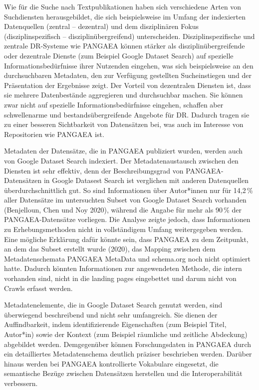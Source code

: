 \documentclass[a4paper,
fontsize=11pt,
oneside,
numbers=noperiodatend,
parskip=half-,
bibliography=totoc,
final
]{scrartcl}
\begin{document}
Wie für die Suche nach Textpublikationen haben sich verschiedene Arten
von Suchdiensten herausgebildet, die sich beispielsweise im Umfang der
indexierten Datenquellen (zentral -- dezentral) und dem disziplinären
Fokus (disziplinspezifisch -- disziplinübergreifend) unterscheiden.
Disziplinspezifische und zentrale DR-Systeme wie PANGAEA können stärker
als disziplinübergreifende oder dezentrale Dienste (zum Beispiel Google
Dataset Search) auf spezielle Informationsbedürfnisse ihrer Nutzenden
eingehen, was sich beispielsweise an den durchsuchbaren Metadaten, den
zur Verfügung gestellten Sucheinstiegen und der Präsentation der
Ergebnisse zeigt. Der Vorteil von dezentralen Diensten ist, dass sie
mehrere Datenbestände aggregieren und durchsuchbar machen. Sie können
zwar nicht auf spezielle Informationsbedürfnisse eingehen, schaffen aber
schwellenarme und bestandsübergreifende Angebote für DR. Dadurch tragen
sie zu einer besseren Sichtbarkeit von Datensätzen bei, was auch im
Interesse von Repositorien wie PANGAEA ist.

Metadaten der Datensätze, die in PANGAEA publiziert wurden, werden auch
von Google Dataset Search indexiert. Der Metadatenaustausch zwischen den
Diensten ist sehr effektiv, denn der Beschreibungsgrad von
PANGAEA-Datensätzen in Google Datasest Search ist verglichen mit anderen
Datenquellen überdurchschnittlich gut. So sind Informationen über
Autor*innen nur für 14,2\,\% aller Datensätze im untersuchten Subset von
Google Dataset Search vorhanden (Benjelloun, Chen und Noy 2020), während
die Angabe für mehr als 90\,\% der PANGAEA-Datensätze vorliegen. Die
Analyse zeigte jedoch, dass Informationen zu Erhebungsmethoden nicht in
vollständigem Umfang weitergegeben werden. Eine mögliche Erklärung dafür
könnte sein, dass PANGAEA zu dem Zeitpunkt, an dem das Subset erstellt
wurde (2020), das Mapping zwischen dem Metadatenschemata PANGAEA
MetaData und schema.org noch nicht optimiert hatte. Dadurch könnten
Informationen zur angewendeten Methode, die intern vorhanden sind, nicht
in die landing pages eingebettet und darum nicht von Crawls erfasst
werden.

Metadatenelemente, die in Google Dataset Search genutzt werden, sind
überwiegend beschreibend und nicht sehr umfangreich. Sie dienen der
Auffindbarkeit, indem identifizierende Eigenschaften (zum Beispiel
Titel, Autor*in) sowie der Kontext (zum Beispiel räumliche und zeitliche
Abdeckung) abgebildet werden. Demgegenüber können Forschungsdaten in
PANGAEA durch ein detailliertes Metadatenschema deutlich präziser
beschrieben werden. Darüber hinaus werden bei PANGAEA kontrollierte
Vokabulare eingesetzt, die semantische Bezüge zwischen Datensätzen
herstellen und die Interoperabilität verbessern.
\end{document}
